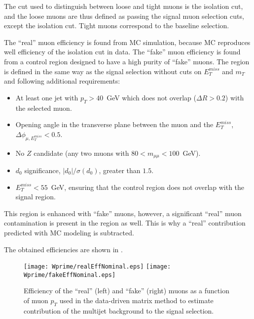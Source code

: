 The cut used to distinguish between loose and tight muons is the isolation cut, and the loose muons
are thus defined as passing the signal muon selection cuts, except the isolation cut. Tight muons correspond
to the baseline selection.

The ``real'' muon efficiency is found from MC simulation, because MC reproduces well efficiency of the isolation cut in data. The ``fake'' muon efficiency is found from a control region designed to have a high purity of ``fake'' muons. The region is defined in the same way as the signal selection without cuts on $E_T^{miss}$ and $m_T$ and following additional requirements:
\begin{itemize}
\item At least one jet with $p_T > 40$~GeV which does not overlap ($\Delta R > 0.2$)
with the selected muon.
\item Opening angle in the transverse plane between the muon and the $E_T^{miss}$, $\Delta\phi_{\mu,E_T^{miss}} < 0.5$.
\item No $Z$ candidate (any two muons with $80 < m_{\mu\mu} < 100$~GeV).
\item $d_0$ significance, $|d_0|/\sigma(d_0)$, greater than $1.5$.
\item $E_T^{miss} < 55$~GeV, ensuring that the control region does not overlap with the signal region.
\end{itemize}
This region is enhanced with ``fake'' muons, however, a significant ``real'' muon contamination is present in the region as well. This is why a ``real'' contribution predicted with MC modeling is subtracted.

The obtained efficiencies are shown in .
\begin{figure}[]
  \centering
  \texttt{[image: Wprime/realEffNominal.eps]}
  \texttt{[image: Wprime/fakeEffNominal.eps]}
  \caption{Efficiency of the ``real'' (left) and ``fake'' (right) muons as a function of muon $p_T$ used in the data-driven matrix method to estimate contribution of the multijet background to the signal selection.}
  \label{fig:matrix_method_efficiencies}
\end{figure}

